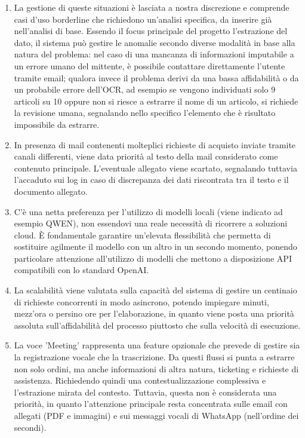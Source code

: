 \documentclass[11pt, a4paper]{article}
\begin{document}
\begin{enumerate}
	\item La gestione di queste situazioni è lasciata a nostra discrezione e comprende casi d'uso borderline che richiedono un'analisi specifica, da inserire già nell'analisi di base. Essendo il focus principale del progetto l'estrazione del dato, il sistema può gestire le anomalie secondo diverse modalità in base alla natura del problema: nel caso di una mancanza di informazioni imputabile a un errore umano del mittente, è possibile contattare direttamente l'utente tramite email; qualora invece il problema derivi da una bassa affidabilità o da un probabile errore dell'OCR, ad esempio se vengono individuati solo 9 articoli su 10 oppure non si riesce a estrarre il nome di un articolo, si richiede la revisione umana, segnalando nello specifico l'elemento che è risultato impossibile da estrarre.
	\item In presenza di mail contenenti molteplici richieste di acquisto inviate tramite canali differenti, viene data priorità al testo della mail considerato come contenuto principale. L'eventuale allegato viene scartato, segnalando tuttavia l'accaduto sui log in caso di discrepanza dei dati riscontrata tra il testo e il documento allegato.
	\item C'è una netta preferenza per l'utilizzo di modelli locali (viene indicato ad esempio QWEN), non essendovi una reale necessità di ricorrere a soluzioni cloud. È fondamentale garantire un'elevata flessibilità che permetta di sostituire agilmente il modello con un altro in un secondo momento, ponendo particolare attenzione all'utilizzo di modelli che mettono a disposizione API compatibili con lo standard OpenAI.
	\item La scalabilità viene valutata sulla capacità del sistema di gestire un centinaio di richieste concorrenti in modo asincrono, potendo impiegare minuti, mezz'ora o persino ore per l'elaborazione, in quanto viene posta una priorità assoluta sull'affidabilità del processo piuttosto che sulla velocità di esecuzione.
	\item La voce 'Meeting' rappresenta una feature opzionale che prevede di gestire sia la registrazione vocale che la trascrizione. Da questi flussi si punta a estrarre non solo ordini, ma anche informazioni di altra natura, ticketing e richieste di assistenza. Richiedendo quindi una contestualizzazione complessiva e l'estrazione mirata del contesto. Tuttavia, questa non è considerata una priorità, in quanto l'attenzione principale resta concentrata sulle email con allegati (PDF e immagini) e sui messaggi vocali di WhatsApp (nell'ordine dei secondi).

\end{enumerate}
\end{document}
